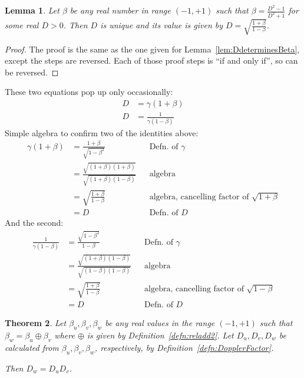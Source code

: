 \documentclass[a4paper]{article}
\theoremstyle{plain}
\newtheorem{theorem}{Theorem}
\newtheorem{lemma}[theorem]{Lemma}
\theoremstyle{definition}
\begin{document}
\begin{lemma}
\label{lem:BetaDeterminesD}
Let $\beta$ be any real number in range $(-1, +1)$ such that
$\beta = \frac{D^2 - 1}{D^2 + 1}$ for some real $D > 0$.
Then $D$ is unique and its value is given by
$D = \sqrt{ \frac{1 + \beta}{1 - \beta} }$.
\end{lemma}

\begin{proof}
The proof is the same as the one given for
Lemma~\ref{lem:DdeterminesBeta}, except the steps are reversed.  Each
of those proof steps is ``if and only if'', so can be reversed.
\end{proof}

These two equations pop up only occasionally:
\begin{align}
D & = \gamma (1+\beta) \label{eqn:Dgammabeta1} \\
D & = \frac{1}{\gamma (1-\beta)} \label{eqn:Dgammabeta2}
\end{align}
Simple algebra to confirm two of the identities above:
\begin{align*}
\gamma (1+\beta)
  & = \frac{1+\beta}{\sqrt{1-\beta^2}} & & \text{Defn. of $\gamma$} \\
  & = \frac{\sqrt{(1+\beta)(1+\beta)}}{\sqrt{(1+\beta)(1-\beta)}} & & \text{algebra} \\
  & = \sqrt{ \frac{1+\beta}{1-\beta} } & & \text{algebra, cancelling factor of $\sqrt{1+\beta}$} \\
  & = D & & \text{Defn. of $D$}
\end{align*}
And the second:
\begin{align*}
\frac{1}{\gamma (1-\beta)}
  & = \frac{\sqrt{1-\beta^2}}{1-\beta} & & \text{Defn. of $\gamma$} \\
  & = \frac{\sqrt{(1+\beta)(1-\beta)}}{\sqrt{(1-\beta)(1-\beta)}} & & \text{algebra} \\
  & = \sqrt{ \frac{1+\beta}{1-\beta} } & & \text{algebra, cancelling factor of $\sqrt{1-\beta}$} \\
  & = D & & \text{Defn. of $D$}
\end{align*}

\begin{theorem}
\label{thm:1dRelVelAddLeadsToDopplerFProduct}
Let $\beta_u, \beta_v, \beta_w$ be any real values in the range
$(-1, +1)$ such that $\beta_w = \beta_u \oplus \beta_v$
where $\oplus$ is given by Definition~\eqref{defn:reladd2}.
Let $D_u, D_v, D_w$ be calculated from $\beta_u, \beta_v, \beta_w$,
respectively, by Definition~\eqref{defn:DopplerFactor}.

Then $D_w = D_u D_v$.
\end{theorem}
\end{document}
